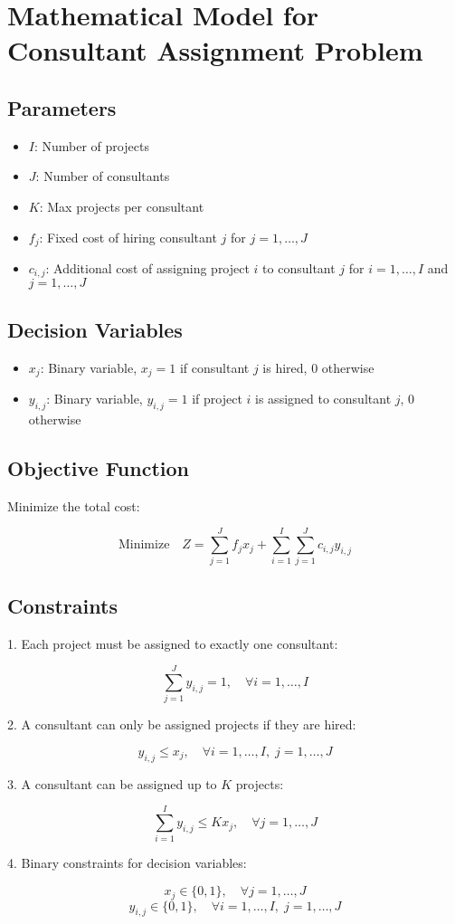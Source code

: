 \documentclass{article}
\begin{document}
\section*{Mathematical Model for Consultant Assignment Problem}

\subsection*{Parameters}
\begin{itemize}
    \item \( I \): Number of projects
    \item \( J \): Number of consultants
    \item \( K \): Max projects per consultant
    \item \( f_j \): Fixed cost of hiring consultant \( j \) for \( j = 1, \ldots, J \)
    \item \( c_{i,j} \): Additional cost of assigning project \( i \) to consultant \( j \) for \( i = 1, \ldots, I \) and \( j = 1, \ldots, J \)
\end{itemize}

\subsection*{Decision Variables}
\begin{itemize}
    \item \( x_{j} \): Binary variable, \( x_{j} = 1 \) if consultant \( j \) is hired, \( 0 \) otherwise
    \item \( y_{i,j} \): Binary variable, \( y_{i,j} = 1 \) if project \( i \) is assigned to consultant \( j \), \( 0 \) otherwise
\end{itemize}

\subsection*{Objective Function}
Minimize the total cost:

\[
\text{Minimize} \quad Z = \sum_{j=1}^{J} f_j x_j + \sum_{i=1}^{I} \sum_{j=1}^{J} c_{i,j} y_{i,j}
\]

\subsection*{Constraints}
1. Each project must be assigned to exactly one consultant:

\[
\sum_{j=1}^{J} y_{i,j} = 1, \quad \forall i = 1, \ldots, I
\]

2. A consultant can only be assigned projects if they are hired:

\[
y_{i,j} \leq x_j, \quad \forall i = 1, \ldots, I, \; j = 1, \ldots, J
\]

3. A consultant can be assigned up to \( K \) projects:

\[
\sum_{i=1}^{I} y_{i,j} \leq K x_j, \quad \forall j = 1, \ldots, J
\]

4. Binary constraints for decision variables:

\[
x_j \in \{0, 1\}, \quad \forall j = 1, \ldots, J
\]
\[
y_{i,j} \in \{0, 1\}, \quad \forall i = 1, \ldots, I, \; j = 1, \ldots, J
\]
\end{document}
